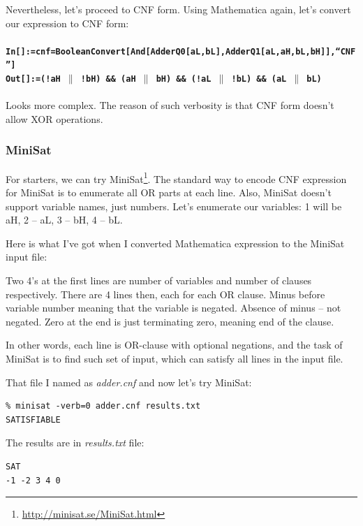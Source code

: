 Nevertheless, let's proceed to \ac{CNF} form. Using Mathematica again, let's convert our expression to \ac{CNF} form:\\
\\
\textbf{\texttt{In[]:=cnf=BooleanConvert[And[AdderQ0[aL,bL],AdderQ1[aL,aH,bL,bH]],``CNF'']}} \\
\textbf{\texttt{Out[]:=(!aH $\|$ !bH) \&\& (aH $\|$ bH) \&\& (!aL $\|$ !bL) \&\& (aL $\|$ bL)}} \\
\\
Looks more complex. The reason of such verbosity is that \ac{CNF} form doesn't allow XOR operations.

\subsubsection{MiniSat}

For starters, we can try MiniSat\footnote{\url{http://minisat.se/MiniSat.html}}.
The standard way to encode \ac{CNF} expression for MiniSat is to enumerate all OR parts at each line.
Also, MiniSat doesn't support variable names, just numbers.
Let's enumerate our variables: 1 will be aH, 2 -- aL, 3 -- bH, 4 -- bL.

Here is what I've got when I converted Mathematica expression to the MiniSat input file:



Two 4's at the first lines are number of variables and number of clauses respectively.
There are 4 lines then, each for each OR clause.
Minus before variable number meaning that the variable is negated.
Absence of minus -- not negated.
Zero at the end is just terminating zero, meaning end of the clause.

In other words, each line is OR-clause with optional negations,
and the task of MiniSat is to find such set of input, which can satisfy all lines in the input file.

That file I named as \textit{adder.cnf} and now let's try MiniSat:

\begin{lstlisting}
% minisat -verb=0 adder.cnf results.txt
SATISFIABLE
\end{lstlisting}

The results are in \textit{results.txt} file:

\begin{lstlisting}
SAT
-1 -2 3 4 0
\end{lstlisting}

